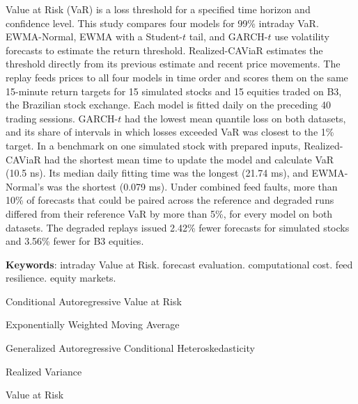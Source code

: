 \documentclass[
	12pt,				%
	openright,			%
	twoside,			%
	a4paper,
	chapter=TITLE,
	english				%
	]{abntex2}
\begin{document}
\begin{resumo}
Value at Risk (VaR) is a loss threshold for a specified time horizon and confidence level. This study compares four models for 99\% intraday VaR. EWMA-Normal, EWMA with a Student-$t$ tail, and GARCH-$t$ use volatility forecasts to estimate the return threshold. Realized-CAViaR estimates the threshold directly from its previous estimate and recent price movements. The replay feeds prices to all four models in time order and scores them on the same 15-minute return targets for 15 simulated stocks and 15 equities traded on B3, the Brazilian stock exchange. Each model is fitted daily on the preceding 40 trading sessions. GARCH-$t$ had the lowest mean quantile loss on both datasets, and its share of intervals in which losses exceeded VaR was closest to the 1\% target. In a benchmark on one simulated stock with prepared inputs, Realized-CAViaR had the shortest mean time to update the model and calculate VaR (10.5 ns). Its median daily fitting time was the longest (21.74 ms), and EWMA-Normal's was the shortest (0.079 ms). Under combined feed faults, more than 10\% of forecasts that could be paired across the reference and degraded runs differed from their reference VaR by more than 5\%, for every model on both datasets. The degraded replays issued 2.42\% fewer forecasts for simulated stocks and 3.56\% fewer for B3 equities.

\vspace{\onelineskip}

\noindent
\textbf{Keywords}: intraday Value at Risk. forecast evaluation. computational cost. feed resilience. equity markets.
\end{resumo}

\listoffigures*
\cleardoublepage

\listoftables*
\cleardoublepage

\begin{siglas}
  \item[CAViaR] Conditional Autoregressive Value at Risk
  \item[EWMA] Exponentially Weighted Moving Average
  \item[GARCH] Generalized Autoregressive Conditional Heteroskedasticity
  \item[RV] Realized Variance
  \item[VaR] Value at Risk
\end{siglas}
\end{document}
